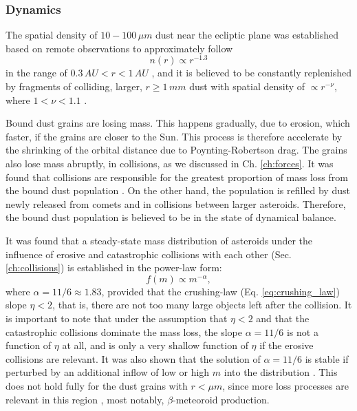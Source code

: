 \subsubsection{Dynamics}

The spatial density of $10 - 100 \, \si{\mu m}$ dust near the ecliptic plane was established based on remote observations to approximately follow 
\begin{equation}
    n(r) \propto r^{-1.3}
\end{equation}
in the range of $0.3 \, \si{AU} < r < 1 \, \si{AU}$ \citep{leinert1981zodiacal}, and it is believed to be constantly replenished by fragments of colliding, larger, $r \geq 1 \, \si{mm}$ dust with spatial density of $\propto r^{-\nu}$, where $1 < \nu < 1.1$ \citep{leinert1983maintain}.

Bound dust grains are losing mass. This happens gradually, due to erosion, which faster, if the grains are closer to the Sun. This process is therefore accelerate by the shrinking of the orbital distance due to Poynting-Robertson drag. The grains also lose mass abruptly, in collisions, as we discussed in Ch. \ref{ch:forces}. It was found that collisions are responsible for the greatest proportion of mass loss from the bound dust population \citep{grun1985collisional}. On the other hand, the population is refilled by dust newly released from comets and in collisions between larger asteroids. Therefore, the bound dust population is believed to be in the state of dynamical balance. 

It was found \citep{dohnanyi1969collisional} that a steady-state mass distribution of asteroids under the influence of erosive and catastrophic collisions with each other (Sec. \ref{ch:collisions}) is established in the power-law form:
\begin{equation}
    f(m) \propto m^{-\alpha},
\end{equation}
where $\alpha = 11/6 \approx 1.83$, provided that the crushing-law (Eq. \ref{eq:crushing_law}) slope $\eta < 2$, that is, there are not too many large objects left after the collision. It is important to note that under the assumption that $\eta < 2$ and that the catastrophic collisions dominate the mass loss, the slope $\alpha = 11/6$ is not a function of $\eta$ at all, and is only a very shallow function of $\eta$ if the erosive collisions are relevant. It was also shown that the solution of $\alpha = 11/6$ is stable if perturbed by an additional inflow of low or high $m$ into the distribution \citep{dohnanyi1969collisional}. This does not hold fully for the dust grains with $r < \si{\mu m}$, since more loss processes are relevant in this region \citep{grun1985collisional}, most notably, $\beta$-meteoroid production.

